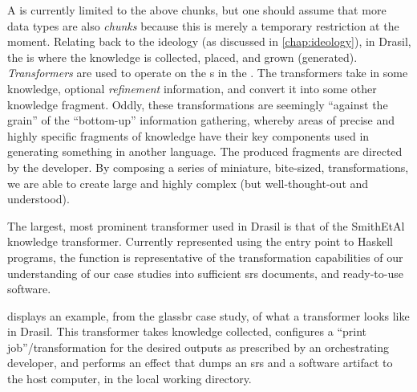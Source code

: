 
A \ChunkDB{} is currently limited to the above chunks, but one should assume
that more data types are also \textit{chunks} because this is merely a temporary
restriction at the moment. Relating back to the ideology (as discussed in
\autoref{chap:ideology}), in Drasil, the \ChunkDB{} is where the knowledge is
collected, placed, and grown (generated). \textit{Transformers} are used to
operate on the \Chunk{}s in the \ChunkDB{}. The transformers take in some
knowledge, optional \textit{refinement} information, and convert it into some
other knowledge fragment. Oddly, these
transformations are seemingly ``against the grain'' of the ``bottom-up''
information gathering, whereby areas of precise and highly specific fragments of
knowledge have their key components used in generating something in another
language. The produced fragments are directed by the developer. By composing a
series of miniature, bite-sized, transformations, we are able to create large
and highly complex (but well-thought-out and understood).

The largest, most prominent transformer used in Drasil is that of the SmithEtAl
knowledge transformer. Currently represented using the entry point to Haskell
programs, the  function is representative of the
transformation capabilities of our understanding of our case studies into
sufficient \acs{srs} documents, and ready-to-use software.


 displays an example, from the
\acs{glassbr} case study, of what a transformer looks like in Drasil. This
transformer takes knowledge collected, configures a ``print job''/transformation
for the desired outputs as prescribed by an orchestrating developer, and
performs an  effect that dumps an \acs{srs} and a software
artifact to the host computer, in the local working directory. 





